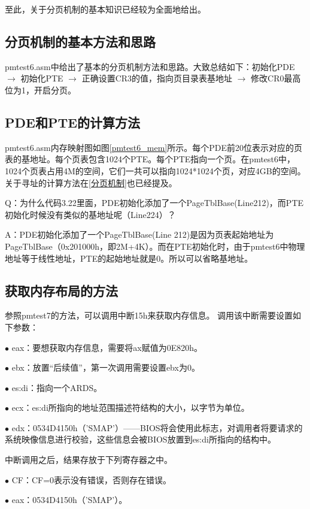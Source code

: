\documentclass[UTF8,12pt]{ctexart}
\begin{document}
至此，关于分页机制的基本知识已经较为全面地给出。

    \subsection{分页机制的基本方法和思路}
    pmtest6.asm中给出了基本的分页机制方法和思路。大致总结如下：初始化PDE $\rightarrow$ 初始化PTE $\rightarrow$ 正确设置CR3的值，指向页目录表基地址 $\rightarrow$ 修改CR0最高位为1，开启分页。
    
    \subsection{PDE和PTE的计算方法}
    pmtest6.asm内存映射图如图\ref{pmtest6_mem}所示。每个PDE前20位表示对应的页表的基地址。每个页表包含1024个PTE。每个PTE指向一个页。在pmtest6中，1024个页表占用4M的空间，它们一共可以指向1024*1024个页，对应4GB的空间。关于寻址的计算方法在\ref{分页机制}也已经提及。
    
    Q：为什么代码3.22里面，PDE初始化添加了一个PageTblBase(Line212)，而PTE初始化时候没有类似的基地址呢（Line224）？
    
    A：PDE初始化添加了一个PageTblBase(Line 212)是因为页表起始地址为PageTblBase（0x201000h，即2M+4K）。而在PTE初始化时，由于pmtest6中物理地址等于线性地址，PTE的起始地址就是0。所以可以省略基地址。
    
    \subsection{获取内存布局的方法}
    参照pmtest7的方法，可以调用中断15h来获取内存信息。
    调用该中断需要设置如下参数：
    
    $\bullet$ eax：要想获取内存信息，需要将ax赋值为0E820h。
    
    $\bullet$ ebx：放置“后续值”，第一次调用需要设置ebx为0。
    
    $\bullet$ es:di：指向一个ARDS。
    
    $\bullet$ ecx：es:di所指向的地址范围描述符结构的大小，以字节为单位。
    
    $\bullet$ edx：0534D4150h（'SMAP'）——BIOS将会使用此标志，对调用者将要请求的系统映像信息进行校验，这些信息会被BIOS放置到es:di所指向的结构中。
    
    中断调用之后，结果存放于下列寄存器之中。
    
    $\bullet$ CF：CF=0表示没有错误，否则存在错误。
    
    $\bullet$ eax：0534D4150h（'SMAP'）。
    
\end{document}
